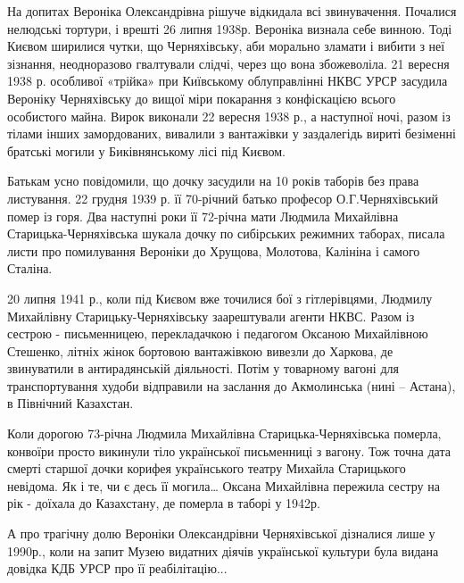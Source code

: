 На допитах Вероніка Олександрівна рішуче відкидала всі звинувачення. Почалися
нелюдські тортури, і врешті 26 липня 1938р. Вероніка визнала себе винною. Тоді
Києвом ширилися чутки, що Черняхівську, аби морально зламати і вибити з неї
зізнання, неодноразово гвалтували слідчі, через що вона збожеволіла. 21 вересня
1938 р. особливої «трійка» при Київському облуправлінні НКВС УРСР  засудила
Вероніку Черняхівську до вищої міри покарання з конфіскацією всього особистого
майна. Вирок виконали 22 вересня 1938 р., а наступної ночі, разом із тілами
інших замордованих, вивалили з вантажівки у заздалегідь вириті безіменні
братські могили у Биківнянському лісі під Києвом.

Батькам усно повідомили, що дочку засудили на 10 років таборів без права
листування. 22 грудня 1939 р. її 70-річний батько професор О.Г.Черняхівський
помер із горя. Два наступні роки її 72-річна мати Людмила Михайлівна
Старицька-Черняхівська шукала дочку по сибірських режимних таборах, писала
листи про помилування Вероніки до Хрущова, Молотова, Калініна і самого Сталіна.

20 липня 1941 р., коли під Києвом вже точилися бої з гітлерівцями, Людмилу
Михайлівну Старицьку-Черняхівську заарештували агенти НКВС. Разом із сестрою -
письменницею, перекладачкою і педагогом Оксаною Михайлівною Стешенко, літніх
жінок бортовою вантажівкою вивезли до Харкова, де звинуватили в антирадянській
діяльності. Потім у товарному вагоні для транспортування худоби відправили на
заслання до Акмолинська (нині – Астана), в Північний Казахстан.

Коли дорогою 73-річна Людмила Михайлівна Старицька-Черняхівська померла,
конвоїри просто викинули тіло української письменниці з вагону. Тож точна
дата смерті старшої дочки корифея українського театру Михайла Старицького
невідома. Як і те, чи є десь її могила… Оксана Михайлівна пережила сестру на
рік - доїхала до Казахстану, де померла в таборі у 1942р.

А про трагічну долю Вероніки Олександрівни Черняхівської дізналися лише у
1990р., коли на запит Музею видатних діячів української культури була видана
довідка КДБ УРСР про її реабілітацію...

